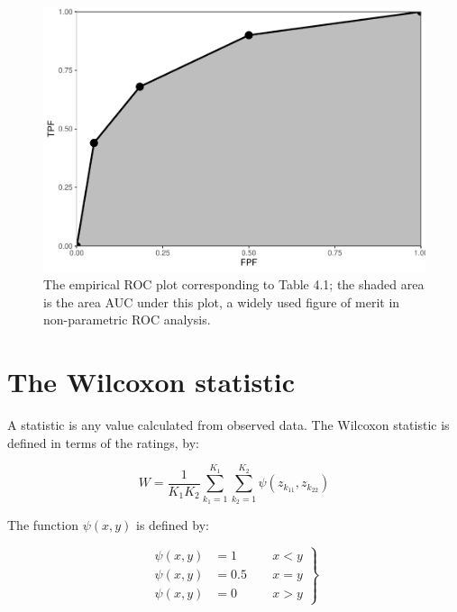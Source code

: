 \documentclass[
]{book}
\begin{document}
\begin{figure}
\centering
\includegraphics{05-empirical-auc_files/figure-latex/empirical-AUC-EmpiricalAUC-1.pdf}
\caption{\label{fig:empirical-AUC-EmpiricalAUC}The empirical ROC plot corresponding to Table 4.1; the shaded area is the area AUC under this plot, a widely used figure of merit in non-parametric ROC analysis.}
\end{figure}

\hypertarget{the-wilcoxon-statistic}{%
\section{The Wilcoxon statistic}\label{the-wilcoxon-statistic}}

A statistic is any value calculated from observed data. The Wilcoxon statistic is defined in terms of the ratings, by:

\begin{equation}
W=\frac{1}{K_1K_2} \sum_{k_1=1}^{K_1} \sum_{k_2=1}^{K_2} \psi\left ( z_{k_11} ,  z_{k_22} \right )
\label{eq:empirical-AUC-Wilcoxon}
\end{equation}

The function \(\psi\left ( x, y \right )\) is defined by:

\begin{equation}
\left.
\begin{aligned}
\psi(x,y)&=1  \qquad & x<y \\
\psi(x,y)&=0.5  & x=y \\
\psi(x,y)&=0  & x>y
\end{aligned}
\right \}
\label{eq:empirical-AUC-PsiFunction}
\end{equation}
\end{document}
